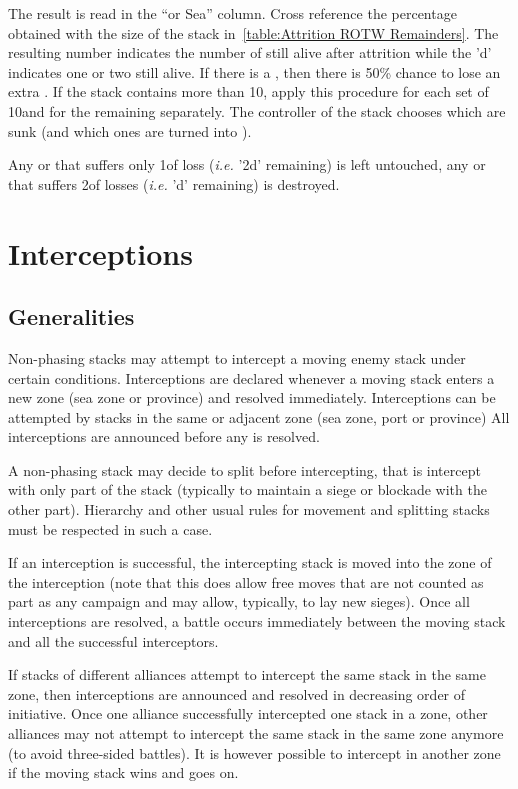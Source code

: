 The result is read in the ``\ROTW or Sea'' column. Cross reference the
percentage obtained with the size of the stack in~\ref{table:Attrition ROTW
  Remainders}. The resulting number indicates the number of \ND still alive
after attrition while the 'd' indicates one or two \NDE still alive. If there
is a \textetoile, then there is 50\% chance to lose an extra \NDE. If the
stack contains more than 10\ND, apply this procedure for each set of 10\ND and
for the remaining \ND separately. The controller of the stack chooses which
\ND are sunk (and which ones are turned into \NDE).

Any \NTD or \NGD that suffers only 1\NDE of loss (\emph{i.e.} '2d' remaining)
is left untouched, any \NTD or \NGD that suffers 2\NDE of losses (\emph{i.e.}
'd' remaining) is destroyed.

\section{Interceptions}
\label{chMilitary:interceptions}
\subsection{Generalities}
Non-phasing stacks may attempt to intercept a moving enemy stack under certain
conditions. Interceptions are declared whenever a moving stack enters a new
zone (sea zone or province) and resolved immediately. Interceptions can be
attempted by stacks in the same or adjacent zone (sea zone, port or province)
All interceptions are announced before any is resolved.

A non-phasing stack may decide to split before intercepting, that is intercept
with only part of the stack (typically to maintain a siege or blockade with
the other part). Hierarchy and other usual rules for movement and splitting
stacks must be respected in such a case.

If an interception is successful, the intercepting stack is moved into the
zone of the interception (note that this does allow free moves that are not
counted as part as any campaign and may allow, typically, to lay new
sieges). Once all interceptions are resolved, a battle occurs immediately
between the moving stack and all the successful interceptors.

If stacks of different alliances attempt to intercept the same stack in the
same zone, then interceptions are announced and resolved in decreasing order
of initiative. Once one alliance successfully intercepted one stack in a zone,
other alliances may not attempt to intercept the same stack in the same zone
anymore (to avoid three-sided battles). It is however possible to intercept in
another zone if the moving stack wins and goes on.

